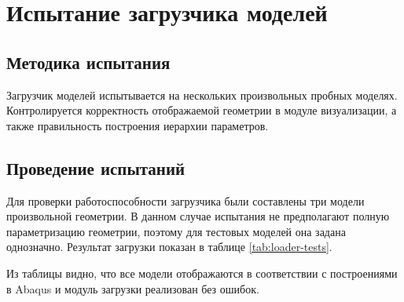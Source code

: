 \documentclass[14pt,oneside,final]{extreport}
\begin{document}
	
	\section{Испытание загрузчика моделей}
	\subsection{Методика испытания}
	Загрузчик моделей испытывается на нескольких произвольных пробных моделях. Контролируется корректность отображаемой геометрии в модуле визуализации, а также правильность построения иерархии параметров.

	\subsection{Проведение испытаний}
	Для проверки работоспособности загрузчика были составлены три модели произвольной геометрии. В данном случае испытания не предполагают полную параметризацию геометрии, поэтому для тестовых моделей она задана однозначно. Результат загрузки показан в таблице \ref{tab:loader-tests}.   
	
	Из таблицы видно, что все модели отображаются в соответствии с построениями в Abaqus и модуль загрузки реализован без ошибок.
	
\end{document}

